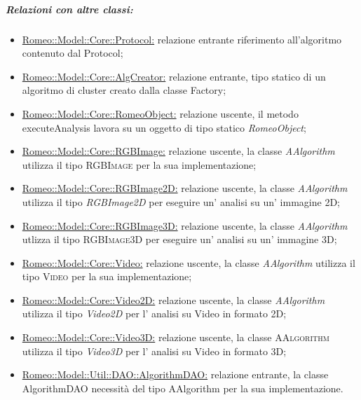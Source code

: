 			\subparagraph{Relazioni con altre classi:}
				\begin{itemize}
					\item \hyperref[protocol]{Romeo::Model::Core::Protocol:} relazione entrante riferimento all'algoritmo contenuto dal Protocol\g{};
					
					\item \hyperref[algC]{Romeo::Model::Core::AlgCreator:} relazione entrante, tipo statico di un algoritmo di cluster\g{} creato dalla classe Factory;
					
					\item \hyperref[]{Romeo::Model::Core::RomeoObject:} relazione uscente, il metodo executeAnalysis lavora su un oggetto di tipo statico \textsl{RomeoObject};
					
					\item \hyperref[]{Romeo::Model::Core::RGBImage:} relazione uscente, la classe \textsl{AAlgorithm} utilizza il tipo \textsc{RGBImage} per la sua implementazione;
					
					\item \hyperref[RGBImage2D]{Romeo::Model::Core::RGBImage2D:} relazione uscente, la classe \textsl{AAlgorithm} utilizza il tipo \textsl{RGBImage2D} per eseguire un' analisi su un' immagine 2D;
					
					\item \hyperref[RGBImage3D]{Romeo::Model::Core::RGBImage3D:} relazione uscente, la classe \textsl{AAlgorithm} utlizza il tipo \textsc{RGBImage3D} per eseguire un' analisi su un' immagine 3D;
					
					\item \hyperref[]{Romeo::Model::Core::Video:} relazione uscente, la classe \textsl{AAlgorithm} utilizza il tipo \textsc{Video} per la sua implementazione;
					
					\item \hyperref[]{Romeo::Model::Core::Video2D:} relazione uscente, la classe \textsl{AAlgorithm} utilizza il tipo \textsl{Video2D} per l' analisi su Video in formato 2D;
					
					\item \hyperref[]{Romeo::Model::Core::Video3D:} relazione uscente, la classe \textsc{AAlgorithm} utilizza il tipo \textsl{Video3D} per l' analisi su Video in formato 3D;
					
					\item \hyperref[]{Romeo::Model::Util::DAO::AlgorithmDAO:} relazione entrante, la classe AlgorithmDAO necessità del tipo AAlgorithm per la sua implementazione.
					
				\end{itemize}
												
